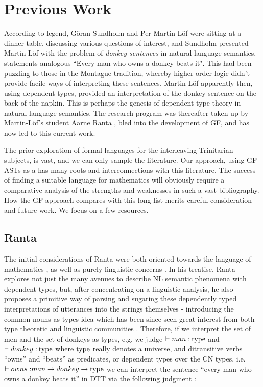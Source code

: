 \section{Previous Work}

According to legend, Göran Sundholm and Per Martin-Löf were sitting at a dinner
table, discussing various questions of interest, and Sundholm presented
Martin-Löf with the problem of \emph{donkey sentences} in natural language
semantics, statements analogous ``Every man who owns a donkey beats it". This
had been puzzling to those in the Montague tradition, whereby higher order logic
didn't provide facile ways of interpreting these sentences. Martin-Löf
apparently then, using dependent types, provided an interpretation of the donkey
sentence on the back of the napkin. This is perhaps the genesis of dependent
type theory in natural language semantics. The research program was thereafter
taken up by Martin-Löf's student Aarne Ranta \cite{ranta1994type}, bled into the
development of GF, and has now led to this current work.

The prior exploration of formal languages for the interleaving Trinitarian
subjects, is vast, and we can only sample the literature\cite{surveyLang}. Our
approach, using GF ASTs as a has many roots and interconnections with this
literature. The success of finding a suitable language for mathematics will
obviously require a comparative analysis of the strengths and weaknesses in such
a vast bibliography. How the GF approach compares with this long list merits
careful consideration and future work. We focus on a few resources.

\subsection{Ranta}

The initial considerations of Ranta were both oriented towards the language of
mathematics \cite{ranta93}, as well as purely linguistic concerns
\cite{ranta1994type}. In his treatise, Ranta explores not just the many avenues
to describe NL semantic phenomena with dependent types, but, after concentrating
on a linguistic analysis, he also proposes a primitive way of parsing and
sugaring these dependently typed interpretations of utterances into the strings
themselves - introducing the common nouns as types idea which has been since
seen great interest from both type theoretic and linguistic communities
\cite{luoCNs}. Therefore, if we interpret the set of men and the set of donkeys
as types, e.g. we judge $\vdash man \; {:}\: {\rm type}$ and $\vdash donkey \; {:}\:
{\rm type}$ where ${\rm type}$ really denotes a universe, and ditransitive verbs
``owns'' and ``beats'' as predicates, or dependent types over the CN types, i.e.
$\vdash owns \; {:} man \rightarrow donkey \rightarrow {\rm type}$ we can
interpret the sentence ``every man who owns a donkey beats it'' in DTT via the
following judgment :

